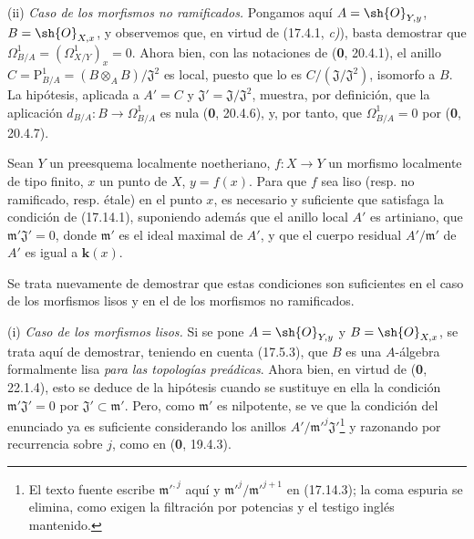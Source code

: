 (ii) \emph{Caso de los morfismos no ramificados.} Pongamos aquí $A=\sh{O}_{Y,y}$, $B=\sh{O}_{X,x}$, y observemos que, en virtud de (17.4.1, \emph{c)}), basta demostrar que $\Omega^1_{B/A}=(\varOmega^1_{X/Y})_x=0$. Ahora bien, con las notaciones de (\textbf 0, 20.4.1), el anillo $C=\mathrm P^1_{B/A}=(B\otimes_A B)/\mathfrak{J}^2$ es local, puesto que lo es $C/(\mathfrak{J}/\mathfrak{J}^2)$, isomorfo a $B$. La hipótesis, aplicada a $A'=C$ y $\mathfrak{J}'=\mathfrak{J}/\mathfrak{J}^2$, muestra, por definición, que la aplicación $d_{B/A}:B\to\Omega^1_{B/A}$ es nula (\textbf 0, 20.4.6), y, por tanto, que $\Omega^1_{B/A}=0$ por (\textbf 0, 20.4.7).

\begin{proposition}[17.14.2]
\label{IV.17.14.2}
Sean $Y$ un preesquema \textup{localmente noetheriano}, $f:X\to Y$ un morfismo localmente de tipo finito, $x$ un punto de $X$, $y=f(x)$. Para que $f$ sea liso \textup{(resp.} no ramificado, \textup{resp.} étale\textup{)} en el punto $x$, es necesario y suficiente que satisfaga la condición de \textup{(17.14.1)}, suponiendo además que el anillo local $A'$ es \textup{artiniano}, que $\mathfrak m'\mathfrak{J}'=0$, donde $\mathfrak m'$ es el ideal maximal de $A'$, y que el cuerpo residual $A'/\mathfrak m'$ de $A'$ es \textup{igual a} $\boldsymbol k(x)$.
\end{proposition}

Se trata nuevamente de demostrar que estas condiciones son suficientes en el caso de los morfismos lisos y en el de los morfismos no ramificados.


(i) \emph{Caso de los morfismos lisos.} Si se pone $A=\sh{O}_{Y,y}$ y $B=\sh{O}_{X,x}$, se trata aquí de demostrar, teniendo en cuenta (17.5.3), que $B$ es una $A$-álgebra formalmente lisa \emph{para las topologías preádicas}. Ahora bien, en virtud de (\textbf 0, 22.1.4), esto se deduce de la hipótesis cuando se sustituye en ella la condición $\mathfrak m'\mathfrak{J}'=0$ por $\mathfrak{J}'\subset\mathfrak m'$. Pero, como $\mathfrak m'$ es nilpotente, se ve que la condición del enunciado ya es suficiente considerando los anillos $A'/\mathfrak m'^j\mathfrak{J}'$\footnote{El texto fuente escribe $\mathfrak m'^{,j}$ aquí y $\mathfrak m'^{j}/\mathfrak m'^{j+1}$ en (17.14.3); la coma espuria se elimina, como exigen la filtración por potencias y el testigo inglés mantenido.} y razonando por recurrencia sobre $j$, como en (\textbf 0, 19.4.3).

